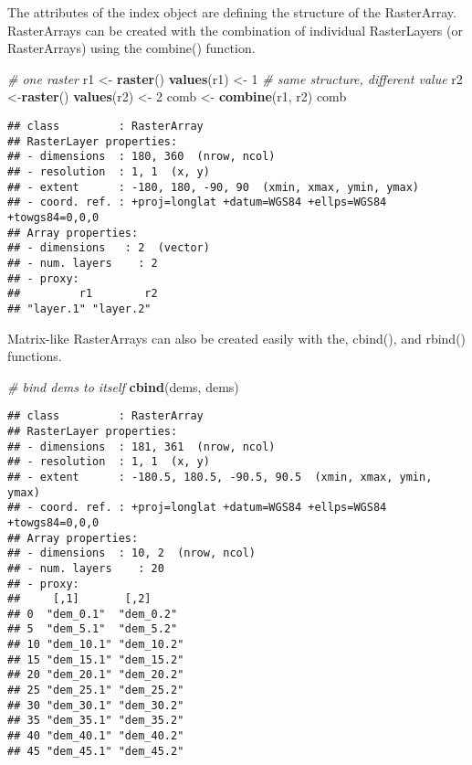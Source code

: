 \documentclass[]{article}
\newenvironment{Shaded}{\begin{snugshade}}{\end{snugshade}}
\newcommand{\KeywordTok}[1]{\textcolor[rgb]{0.13,0.29,0.53}{\textbf{#1}}}
\newcommand{\DecValTok}[1]{\textcolor[rgb]{0.00,0.00,0.81}{#1}}
\newcommand{\StringTok}[1]{\textcolor[rgb]{0.31,0.60,0.02}{#1}}
\newcommand{\CommentTok}[1]{\textcolor[rgb]{0.56,0.35,0.01}{\textit{#1}}}
\newcommand{\NormalTok}[1]{#1}
\begin{document}
The attributes of the index object are defining the structure of the
RasterArray. RasterArrays can be created with the combination of
individual RasterLayers (or RasterArrays) using the combine() function.

\begin{Shaded}
\begin{Highlighting}[]
\CommentTok{# one raster}
\NormalTok{r1 <-}\StringTok{ }\KeywordTok{raster}\NormalTok{()}
\KeywordTok{values}\NormalTok{(r1) <-}\StringTok{ }\DecValTok{1}
\CommentTok{# same structure, different value}
\NormalTok{r2 <-}\KeywordTok{raster}\NormalTok{()}
\KeywordTok{values}\NormalTok{(r2) <-}\StringTok{ }\DecValTok{2}
\NormalTok{comb <-}\StringTok{ }\KeywordTok{combine}\NormalTok{(r1, r2)}
\NormalTok{comb}
\end{Highlighting}
\end{Shaded}

\begin{verbatim}
## class         : RasterArray 
## RasterLayer properties: 
## - dimensions  : 180, 360  (nrow, ncol)
## - resolution  : 1, 1  (x, y)
## - extent      : -180, 180, -90, 90  (xmin, xmax, ymin, ymax)
## - coord. ref. : +proj=longlat +datum=WGS84 +ellps=WGS84 +towgs84=0,0,0 
## Array properties: 
## - dimensions   : 2  (vector)
## - num. layers    : 2
## - proxy:
##         r1        r2 
## "layer.1" "layer.2"
\end{verbatim}

Matrix-like RasterArrays can also be created easily with the, cbind(),
and rbind() functions.

\begin{Shaded}
\begin{Highlighting}[]
\CommentTok{# bind dems to itself}
\KeywordTok{cbind}\NormalTok{(dems, dems)}
\end{Highlighting}
\end{Shaded}

\begin{verbatim}
## class         : RasterArray 
## RasterLayer properties: 
## - dimensions  : 181, 361  (nrow, ncol)
## - resolution  : 1, 1  (x, y)
## - extent      : -180.5, 180.5, -90.5, 90.5  (xmin, xmax, ymin, ymax)
## - coord. ref. : +proj=longlat +datum=WGS84 +ellps=WGS84 +towgs84=0,0,0 
## Array properties: 
## - dimensions  : 10, 2  (nrow, ncol)
## - num. layers    : 20
## - proxy:
##     [,1]       [,2]      
## 0  "dem_0.1"  "dem_0.2" 
## 5  "dem_5.1"  "dem_5.2" 
## 10 "dem_10.1" "dem_10.2"
## 15 "dem_15.1" "dem_15.2"
## 20 "dem_20.1" "dem_20.2"
## 25 "dem_25.1" "dem_25.2"
## 30 "dem_30.1" "dem_30.2"
## 35 "dem_35.1" "dem_35.2"
## 40 "dem_40.1" "dem_40.2"
## 45 "dem_45.1" "dem_45.2"
\end{verbatim}
\end{document}
